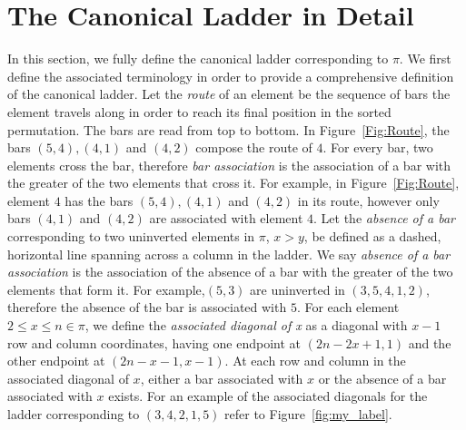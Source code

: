 \section{The Canonical Ladder in Detail}
In this section, we fully define the canonical ladder corresponding to $\pi$. We first define the associated terminology in order 
to provide a comprehensive definition of the canonical ladder.
Let the \emph{route} of an element be the sequence of bars the element travels along in order to reach its final position in the 
sorted permutation. The bars are read from top to bottom. In Figure~\ref{Fig:Route}, the bars $(5,4),(4,1)$ and $(4,2)$ compose the route of $4$. 
For every bar, two elements cross the bar, therefore \emph{bar association} is the association of a bar with the greater of the two elements that 
cross it. For example, in Figure~\ref{Fig:Route}, element $4$ has the bars $(5,4),(4,1)$ and 
$(4,2)$ in its route, however only bars $(4,1)$ and $(4,2)$ are associated with element $4$. Let the \emph{absence of a bar} corresponding to 
two uninverted elements in $\pi$, $x>y$, be defined as a dashed, horizontal line spanning across a column in the ladder. 
We say \emph{absence of a bar association} is the association of the absence of a bar with the greater of the two elements that form it. 
For example,$(5,3)$ are uninverted in $(3,5,4,1,2)$, therefore the absence of the bar is associated with $5$. 
For each element $2 \leq x \leq n \in \pi$, we define the \emph{associated diagonal of x} as a diagonal with $x-1$ 
row and column coordinates, having one endpoint at $(2n-2x+1, 1)$ and the other endpoint at $(2n-x-1,x-1)$.  
At each row and column in the associated diagonal of $x$, either a bar associated with $x$ or the absence of a bar associated with $x$ exists. 
For an example of the associated diagonals for the ladder corresponding to $(3,4,2,1,5)$ refer to Figure~\ref{fig:my_label}. 
